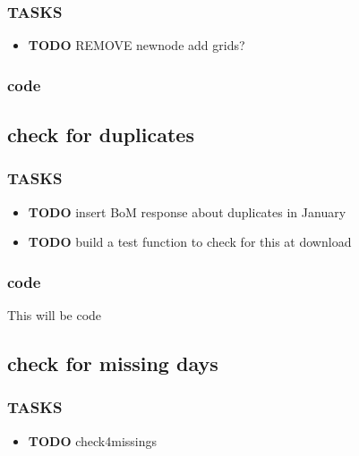 \documentclass[a4paper]{article}
\begin{document}
\subsubsection{TASKS}
\label{sec-6-2-1}
\begin{itemize}

\item \textbf{TODO} REMOVE newnode add grids?\\
\label{sec-6-2-1-1}%
\end{itemize} %
\subsubsection{code}
\label{sec-6-2-2}
\subsection{check for duplicates}
\label{sec-6-3}
\subsubsection{TASKS}
\label{sec-6-3-1}
\begin{itemize}

\item \textbf{TODO} insert BoM response about duplicates in January\\
\label{sec-6-3-1-1}%
\item \textbf{TODO} build a test function to check for this at download\\
\label{sec-6-3-1-2}%
\end{itemize} %
\subsubsection{code}
\label{sec-6-3-2}

This will be code
\subsection{check for missing days}
\label{sec-6-4}
\subsubsection{TASKS}
\label{sec-6-4-1}
\begin{itemize}

\item \textbf{TODO} check4missings\\
\label{sec-6-4-1-1}%
\end{itemize} %
\end{document}
